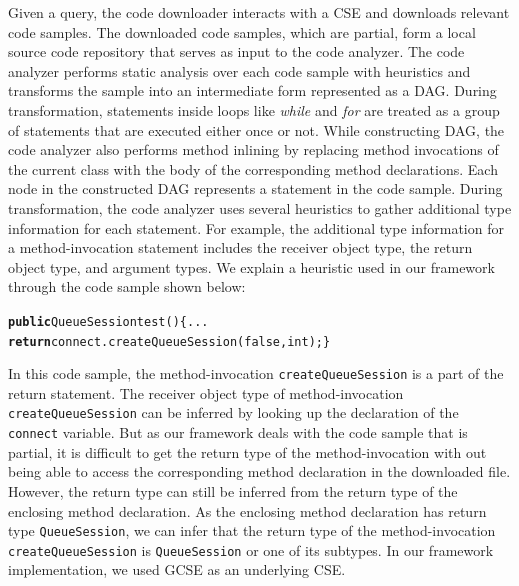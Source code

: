 \documentclass{sigplanconf}
\newcommand{\CodeIn}[1]{{\small\texttt{#1}}}
\newenvironment{CodeOut}{\begin{small}}{\end{small}}
\begin{document}
Given a query, the code downloader interacts with a CSE and downloads
relevant code samples. The downloaded code samples, which are partial, form a local
source code repository that serves as input to the code analyzer.
The code analyzer performs static analysis over each code sample with heuristics and
transforms the sample into an intermediate form represented as a DAG.
During transformation, statements inside loops like \emph{while} and \emph{for}
are treated as a group of statements that are executed either once or not.
While constructing DAG, the code analyzer also performs method inlining
by replacing method invocations of the current class with the
body of the corresponding method declarations. Each node in the constructed
DAG represents a statement in the code sample. During transformation,
the code analyzer uses several heuristics to gather additional type information
for each statement. For example, the additional type information for
a method-invocation statement includes the receiver object type, the
return object type, and argument types. We explain a heuristic
used in our framework through the code sample shown below:

\begin{CodeOut}
\begin{alltt}
\textbf{public} QueueSession test()\hspace*{0.2in}\{ ...
\hspace*{0.4in}\textbf{return} connect.createQueueSession(false,int);\}
\end{alltt}
\end{CodeOut}
\vspace*{-1ex}

In this code sample, the method-invocation
\CodeIn{createQueueSession} is a part of the return statement. The
receiver object type of method-invocation
\CodeIn{createQueueSession} can be inferred by looking up the
declaration of the \CodeIn{connect} variable. But as our framework
deals with the code sample that is partial, it is difficult to get
the return type of the method-invocation with out being able to
access the corresponding method declaration in the downloaded file.
However, the return type can still be inferred from the return type
of the enclosing method declaration. As the enclosing method
declaration has return type \CodeIn{QueueSession}, we can infer that
the return type of the method-invocation \CodeIn{createQueueSession}
is \CodeIn{QueueSession} or one of its subtypes. In our framework
implementation, we used GCSE as an underlying CSE.
\end{document}
